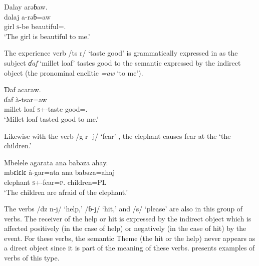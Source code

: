 \noindent\parbox{\textwidth}{\ea \label{ex:9:10}
Dalay  arəɓaw.\\
\gll  dalaj  a-rəɓ=aw\\
      girl    {\textsc{s}-be beautiful={\oneS}.{\IO}}\\
\glt  ‘The girl is beautiful to me.’ 
\z}

The experience verb  /ts r/ ‘taste good’ is grammatically expressed in  as the subject \textit{ɗaf}  ‘millet loaf' tastes good to the semantic \LOC expressed by the indirect object (the pronominal enclitic \textit{=aw} ‘to me’).

\ea \label{ex:9:11}
Ɗaf  acaraw. \\
\gll  ɗaf     à-tsar=aw \\
      {millet loaf}  {\textsc{s}+{\PFV}-taste good}={\oneS}.{\IO}\\
\glt  ‘Millet loaf tasted good to me.’ 
\z

Likewise with the verb /g r -j/  ‘fear’ ,  the elephant causes fear at the \LOC ‘the children.’

\ea \label{ex:9:12}
Mbelele  agarata  ana  babəza  ahay. \\
\gll  mbɛlɛlɛ   à-gar=ata  ana  babəza=ahaj\\
      elephant  \textsc{s}+{\PFV}-fear=\textsc{p}.{\IO}  {\DAT} children=PL\\
\glt  ‘The children are afraid of the elephant.’
\z

The verbs /dz n-j/ ‘help,’ /ɓ-j/ ‘hit,’ and /s/ ‘please' are also in this group of verbs. The receiver of the help or hit is expressed by the indirect object which is affected positively (in the case of help) or negatively (in the case of hit) by the event. For these verbs, the semantic Theme (the hit or the help) never appears as a direct object since it is part of the meaning of these verbs.  presents examples of verbs of this type.

